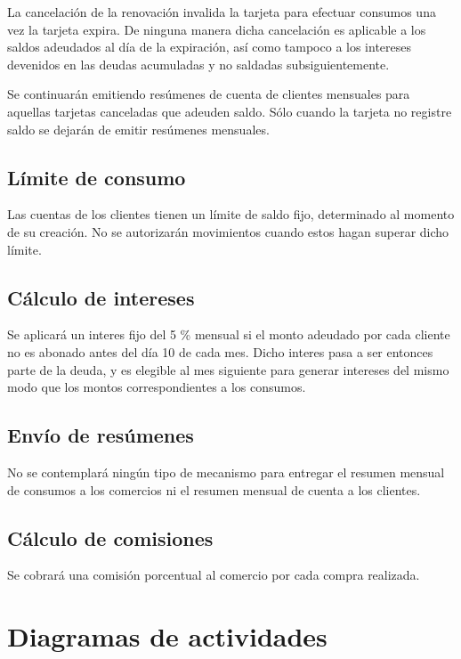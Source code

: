 La cancelación de la renovación invalida la tarjeta para efectuar consumos una
vez la tarjeta expira. De ninguna manera dicha cancelación es aplicable a los
saldos adeudados al día de la expiración, así como tampoco a los intereses
devenidos en las deudas acumuladas y no saldadas subsiguientemente.

Se continuarán emitiendo resúmenes de cuenta de clientes mensuales para aquellas
tarjetas canceladas que adeuden saldo. Sólo cuando la tarjeta no registre saldo
se dejarán de emitir resúmenes mensuales.

\subsection{Límite de consumo}

Las cuentas de los clientes tienen un límite de saldo fijo, determinado al momento de su creación. No se autorizarán movimientos cuando estos hagan superar dicho límite.

\subsection{Cálculo de intereses}

Se aplicará un interes fijo del 5 \% mensual si el monto adeudado por cada
cliente no es abonado antes del día 10 de cada mes. Dicho interes pasa a ser
entonces parte de la deuda, y es elegible al mes siguiente para generar
intereses del mismo modo que los montos correspondientes a los consumos.

\subsection{Envío de resúmenes}

No se contemplará ningún tipo de mecanismo para entregar el resumen mensual de
consumos a los comercios ni el resumen mensual de cuenta a los clientes.

\subsection{Cálculo de comisiones}

Se cobrará una comisión porcentual al comercio por cada compra realizada.

\section{Diagramas de actividades}

